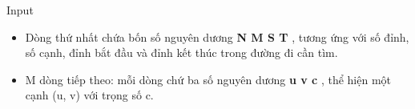 Input  
\begin{itemize}
	\item     Dòng thứ nhất chứa bốn số nguyên dương    \textbf{     N M S T    }    , tương ứng với số đỉnh, số cạnh, đỉnh bắt đầu và đỉnh kết thúc trong đường đi cần tìm.   
	\item     M dòng tiếp theo: mỗi dòng chứ ba số nguyên dương    \textbf{     u v c    }    , thể hiện một cạnh (u, v) với trọng số c.   
\end{itemize}
